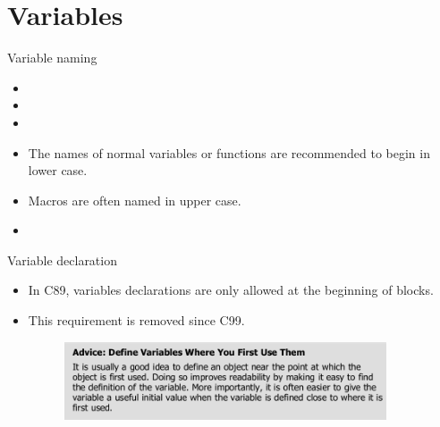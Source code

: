 \documentclass[handout]{beamer}
\begin{document}
\section{Variables}

\begin{frame}{Variable naming}
    \begin{itemize}
        \item {}
        \item {}
        \item {}
        \pause
        \item The names of normal variables or functions are recommended to begin in lower case.
        \item Macros are often named in upper case.
        \pause
        \item {}
    \end{itemize}
\end{frame}

\begin{frame}{Variable declaration}
    \begin{itemize}
        \item In C89, variables declarations are only allowed at the beginning of blocks.
        \item This requirement is removed since C99.
        \begin{figure}[h]
            \centering
            \includegraphics[width=0.9\textwidth]{img/advice-variables.png}
        \end{figure}
    \end{itemize}
\end{frame}
\end{document}
